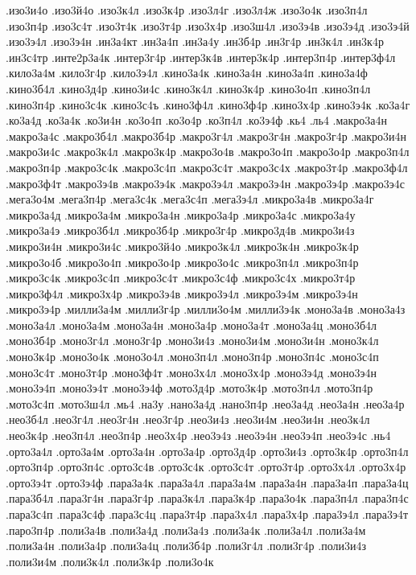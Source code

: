 {.изо3и4о
.изо3й4о
.изо3к4л
.изо3к4р
.изо3л4г
.изо3л4ж
.изо3о4к
.изо3п4л
.изо3п4р
.изо3с4т
.изо3т4к
.изо3т4р
.изо3х4р
.изо3ш4л
.изо3э4в
.изо3э4д
.изо3э4й
.изо3э4л
.изо3э4н
.ин3а4кт
.ин3а4п
.ин3а4у
.ин3б4р
.ин3г4р
.ин3к4л
.ин3к4р
.ин3с4тр
.инте2р3а4к
.интер3г4р
.интер3к4в
.интер3к4р
.интер3п4р
.интер3ф4л
.кило3а4м
.кило3г4р
.кило3э4л
.кино3а4к
.кино3а4н
.кино3а4п
.кино3а4ф
.кино3б4л
.кино3д4р
.кино3и4с
.кино3к4л
.кино3к4р
.кино3о4п
.кино3п4л
.кино3п4р
.кино3с4к
.кино3с4ъ
.кино3ф4л
.кино3ф4р
.кино3х4р
.кино3э4к
.ко3а4г
.ко3а4д
.ко3а4к
.ко3и4н
.ко3о4п
.ко3о4р
.ко3п4л
.ко3э4ф
.кь4
.ль4
.макро3а4н
.макро3а4с
.макро3б4л
.макро3б4р
.макро3г4л
.макро3г4н
.макро3г4р
.макро3и4н
.макро3и4с
.макро3к4л
.макро3к4р
.макро3о4в
.макро3о4п
.макро3о4р
.макро3п4л
.макро3п4р
.макро3с4к
.макро3с4п
.макро3с4т
.макро3с4х
.макро3т4р
.макро3ф4л
.макро3ф4т
.макро3э4в
.макро3э4к
.макро3э4л
.макро3э4н
.макро3э4р
.макро3э4с
.мега3о4м
.мега3п4р
.мега3с4к
.мега3с4п
.мега3э4л
.микро3а4в
.микро3а4г
.микро3а4д
.микро3а4м
.микро3а4н
.микро3а4р
.микро3а4с
.микро3а4у
.микро3а4э
.микро3б4л
.микро3б4р
.микро3г4р
.микро3д4в
.микро3и4з
.микро3и4н
.микро3и4с
.микро3й4о
.микро3к4л
.микро3к4н
.микро3к4р
.микро3о4б
.микро3о4п
.микро3о4р
.микро3о4с
.микро3п4л
.микро3п4р
.микро3с4к
.микро3с4п
.микро3с4т
.микро3с4ф
.микро3с4х
.микро3т4р
.микро3ф4л
.микро3х4р
.микро3э4в
.микро3э4л
.микро3э4м
.микро3э4н
.микро3э4р
.милли3а4м
.милли3г4р
.милли3о4м
.милли3э4к
.моно3а4в
.моно3а4з
.моно3а4л
.моно3а4м
.моно3а4н
.моно3а4р
.моно3а4т
.моно3а4ц
.моно3б4л
.моно3б4р
.моно3г4л
.моно3г4р
.моно3и4з
.моно3и4м
.моно3и4н
.моно3к4л
.моно3к4р
.моно3о4к
.моно3о4л
.моно3п4л
.моно3п4р
.моно3п4с
.моно3с4п
.моно3с4т
.моно3т4р
.моно3ф4т
.моно3х4л
.моно3х4р
.моно3э4д
.моно3э4н
.моно3э4п
.моно3э4т
.моно3э4ф
.мото3д4р
.мото3к4р
.мото3п4л
.мото3п4р
.мото3с4п
.мото3ш4л
.мь4
.на3у
.нано3а4д
.нано3п4р
.нео3а4д
.нео3а4н
.нео3а4р
.нео3б4л
.нео3г4л
.нео3г4н
.нео3г4р
.нео3и4з
.нео3и4м
.нео3и4н
.нео3к4л
.нео3к4р
.нео3п4л
.нео3п4р
.нео3х4р
.нео3э4з
.нео3э4н
.нео3э4п
.нео3э4с
.нь4
.орто3а4л
.орто3а4м
.орто3а4н
.орто3а4р
.орто3д4р
.орто3и4з
.орто3к4р
.орто3п4л
.орто3п4р
.орто3п4с
.орто3с4в
.орто3с4к
.орто3с4т
.орто3т4р
.орто3х4л
.орто3х4р
.орто3э4т
.орто3э4ф
.пара3а4к
.пара3а4л
.пара3а4м
.пара3а4н
.пара3а4п
.пара3а4ц
.пара3б4л
.пара3г4н
.пара3г4р
.пара3к4л
.пара3к4р
.пара3о4к
.пара3п4л
.пара3п4с
.пара3с4п
.пара3с4ф
.пара3с4ц
.пара3т4р
.пара3х4л
.пара3х4р
.пара3э4л
.пара3э4т
.паро3п4р
.поли3а4в
.поли3а4д
.поли3а4з
.поли3а4к
.поли3а4л
.поли3а4м
.поли3а4н
.поли3а4р
.поли3а4ц
.поли3б4р
.поли3г4л
.поли3г4р
.поли3и4з
.поли3и4м
.поли3к4л
.поли3к4р
.поли3о4к
}
